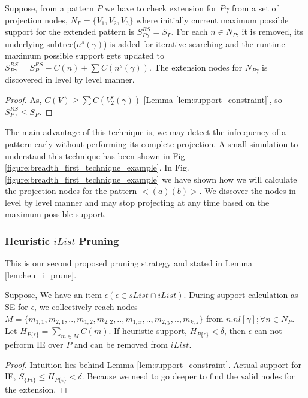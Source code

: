 \begin{lem}\label{lem:bfs_prune}
  Suppose, from a pattern $P$ we have to check extension for $P\gamma$ from a set of projection nodes, $N_{P}=\{V_{1},V_{2},V_{3}\}$ where initially current maximum possible support for the extended pattern is $S_{P\gamma}^{RS}=S_{P}$. For each $n \in N_{P}$, it is removed, its underlying subtree($n^{s}(\gamma)$) is added for iterative searching and the runtime maximum possible support gets updated to $S^{RS}_{P\gamma}=S_{P}^{RS}-C(n)+\sum C(n^{s}(\gamma))$. The extension nodes for $N_{P\gamma}$ is discovered in level by level manner.
\end{lem}

\begin{proof}
     As, $C(V) \geq \sum C(V_{2}^{s}(\gamma))$ [Lemma \ref{lem:support_constraint}], so $S^{RS}_{P\gamma} \leq S_{P}$.
\end{proof}


The main advantage of this technique is, we may detect the infrequency of a pattern early without performing its complete projection. A small simulation to understand this technique has been shown in Fig \ref{figure:breadth_first_technique_example}. In Fig. \ref{figure:breadth_first_technique_example} we have shown how we will calculate the projection nodes for the pattern $< (a)(b) >$. We discover the nodes in level by level manner and may stop projecting at any time based on the maximum possible support.



\subsubsection{Heuristic $iList$ Pruning} \label{section:heuristic_pruning}
This is our second proposed pruning strategy and stated in Lemma \ref{lem:heu_i_prune}.
\begin{lem} \label{lem:heu_i_prune}
   Suppose, We have an item $\epsilon(\epsilon \in sList \cap iList)$. During support calculation as SE for $\epsilon$, we collectively reach nodes $M=\{m_{1,1},m_{2,1},..,m_{1,2},m_{2,2},..,m_{1,x},..,m_{2,y},..,m_{k,z}\}$ from $n.nl[\gamma]; \forall n \in N_{P}$. Let $H_{P\{\epsilon\}}= \sum_{m \in M} C(m)$. If heuristic support, $H_{P\{\epsilon\}} <  \delta$, then $\epsilon$ can not pefrorm IE over $P$ and can be removed from $iList$.
\end{lem}
\begin{proof}
    Intuition lies behind Lemma \ref{lem:support_constraint}. Actual support for IE, $S_{\{P\epsilon\}} \leq H_{P\{\epsilon\}} < \delta$. Because we need to go deeper to find the valid nodes for the extension.
\end{proof}

